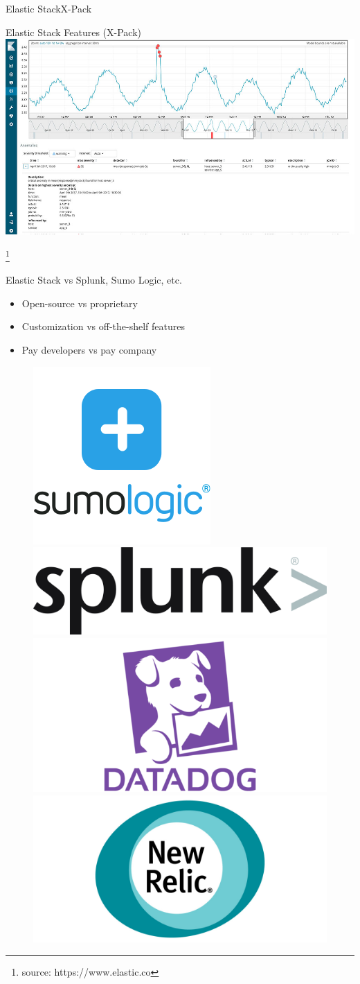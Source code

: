 \documentclass{beamer}
\newcommand\blfootnote[1]{%
  \begingroup
  \renewcommand\thefootnote{}\footnote{\tiny  #1 }%
  \addtocounter{footnote}{-1}%
  \endgroup
}
\begin{document}
\begin{frame}{Elastic Stack}{X-Pack}
	\begin{block}{Elastic Stack Features (X-Pack)}
		\centering
		\includegraphics[width=0.8\linewidth]{kibana_anomaly_detection.jpg}
	\end{block}
	\blfootnote{source: https://www.elastic.co}
\end{frame}


\begin{frame}{Elastic Stack vs Splunk, Sumo Logic, etc.}
	\begin{itemize}
		\item{Open-source vs proprietary}
		\item{Customization vs off-the-shelf features}
  		\item{Pay developers vs pay company}
	\end{itemize}
	\begin{multicols}{2}
        \begin{figure}[ht!]
            \includegraphics[width=.2\textwidth]{sumo_logic_logo}\hfill
            \includegraphics[width=.2\textwidth]{splunk_logo}\hfill
            \includegraphics[width=.2\textwidth]{datadog_logo}\hfill
            \includegraphics[width=.2\textwidth]{new_relic_logo}
        \end{figure}
    \end{multicols}
\end{frame}
\end{document}
